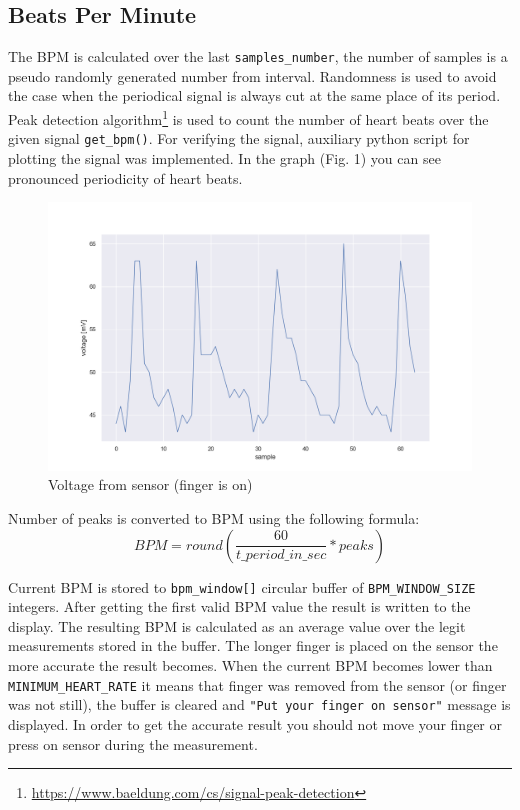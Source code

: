 \documentclass[a4paper, 11pt, twocolumn]{article}
\begin{document}
\subsection{Beats Per Minute}
The BPM is calculated over the last \texttt{samples\_number}, the number of samples is a pseudo randomly generated number from \newline[55; 65] interval. Randomness is used to avoid the case when the periodical signal is always cut at the same place of its period. Peak detection algorithm\footnote{\url{https://www.baeldung.com/cs/signal-peak-detection}} is used to count the number of heart beats over the given signal \texttt{get\_bpm()}. For verifying the signal, auxiliary python script for plotting the signal was implemented. In the graph (Fig. 1) you can see pronounced periodicity of heart beats.
\begin{figure}[]
    \includegraphics[scale=0.3]{img/heart_beats.png}
    \caption{Voltage from sensor (finger is on)}
    \label{graph}
\end{figure}
Number of peaks is converted to BPM using the following formula:
\[ BPM = round(\frac{60}{t\_period\_in\_sec} * peaks) \]
\par
Current BPM is stored to \texttt{bpm\_window[]} circular buffer of \texttt{BPM\_WINDOW\_SIZE} integers.
After getting the first valid BPM value the result is written to the display. The resulting BPM is calculated as an average value over the legit measurements stored in the buffer. The longer finger is placed on the sensor the more accurate the result becomes. When the current BPM becomes lower than \texttt{MINIMUM\_HEART\_RATE} it means that finger was removed from the sensor (or finger was not still), the buffer is cleared and \texttt{"Put your finger on sensor"} message is displayed. In order to get the accurate result you should not move your finger or press on sensor during the measurement.
\end{document}
